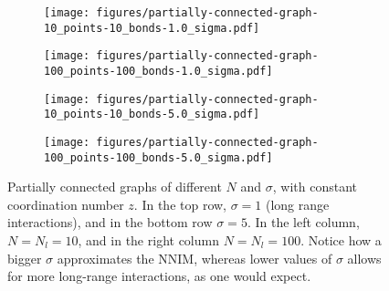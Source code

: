 \begin{figure}[t]
	\begin{subfigure}{0.5\textwidth}
	\centering
	\texttt{[image: figures/partially-connected-graph-10\_points-10\_bonds-1.0\_sigma.pdf]}
\end{subfigure}
	\begin{subfigure}{0.5\textwidth}
	\centering
	\texttt{[image: figures/partially-connected-graph-100\_points-100\_bonds-1.0\_sigma.pdf]}
\end{subfigure}
	\begin{subfigure}{0.5\textwidth}
	\centering
	\texttt{[image: figures/partially-connected-graph-10\_points-10\_bonds-5.0\_sigma.pdf]}
\end{subfigure}
	\begin{subfigure}{0.5\textwidth}
	\centering
	\texttt{[image: figures/partially-connected-graph-100\_points-100\_bonds-5.0\_sigma.pdf]}
\end{subfigure}
	\caption{Partially connected graphs of different $N$ and $\sigma$, with constant coordination number $z.$ In the top row, $\sigma = 1$ (long range interactions), and in the bottom row  $\sigma = 5.$ In the left column,  $N=N_l = 10$,  and in the right column $N=N_l = 100.$ Notice how a bigger $\sigma$ approximates the NNIM, whereas lower values of $\sigma$ allows for more long-range interactions, as one would expect.}
	\label{fig:a-partially-connected-graph}
\end{figure}

%

